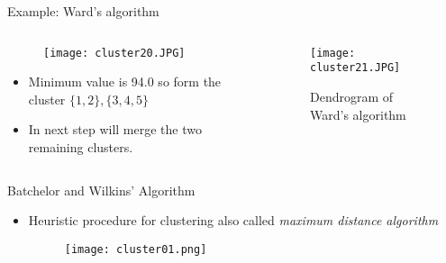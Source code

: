 \begin{frame}{Example: Ward's algorithm}
\begin{columns}
\begin{column}{5cm}
\begin{figure}
\texttt{[image: cluster20.JPG]}
\end{figure}
\begin{itemize}
\item Minimum value is 94.0 so form the cluster $\{1,2\},\{3,4,5\}$
\item In next step will merge the two remaining clusters.
\end{itemize}
\end{column}
\begin{column}{5.5cm}
\begin{figure}
\texttt{[image: cluster21.JPG]}
\caption{Dendrogram of Ward's algorithm}
\end{figure}
\end{column}
\end{columns}
\end{frame}


\begin{frame}{Batchelor and Wilkins' Algorithm}
\begin{itemize}
\item Heuristic procedure for clustering also called \textit{\color{mycolor2}maximum distance algorithm}
\begin{figure}
\texttt{[image: cluster01.png]}
\end{figure}
\end{itemize}
\end{frame}



